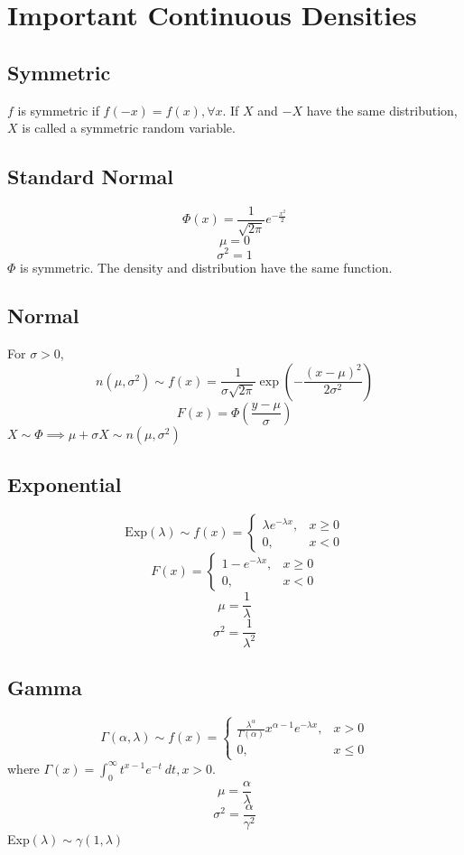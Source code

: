 \documentclass[10pt, a4paper]{extarticle}
\theoremstyle{definition}
\begin{document}
	\section{Important Continuous Densities}
	\subsection{Symmetric}
	$f$ is symmetric if $f(-x)=f(x),\forall x$. If $X$ and $-X$ have the same distribution, $X$ is called a symmetric random variable.

	\subsection{Standard Normal}
	\[\Phi(x)=\frac{1}{\sqrt{2\pi}}e^{-\frac{x^2}{2}}\]
	\[\mu=0\]
	\[\sigma^2=1\]
	$\Phi$ is symmetric. The density and distribution have the same function.

	\subsection{Normal}
	For $\sigma>0$,
	\[n(\mu,\sigma^2)\sim f(x)=\frac{1}{\sigma\sqrt{2\pi}}\exp\left(-\frac{(x-\mu)^2}{2\sigma^2}\right)\]
		\[F(x)=\Phi\left(\frac{y-\mu}{\sigma}\right)\]
	$X\sim \Phi\implies \mu+\sigma X\sim n(\mu,\sigma^2)$

	\subsection{Exponential}
	\[\text{Exp}(\lambda)\sim f(x)=
		\begin{cases}
			\lambda e^{-\lambda x},&x\geq 0\\
			0,&x<0
		\end{cases}
	\]
	\[F(x)=
		\begin{cases}
			1- e^{-\lambda x},&x\geq 0\\
			0,&x<0
		\end{cases}
	\]
	\[\mu=\frac{1}{\lambda}\]
	\[\sigma^2=\frac{1}{\lambda^2}\]

	\subsection{Gamma}
	\[\Gamma(\alpha,\lambda)\sim f(x)=
		\begin{cases}
			\frac{\lambda^\alpha}{\Gamma(\alpha)}x^{\alpha-1} e^{-\lambda x},&x> 0\\
			0,&x\leq 0
		\end{cases}
	\]
	where $\Gamma(x)=\int_0^\infty t^{x-1}e^{-t}\ dt, x>0$.
	\[\mu=\frac{\alpha}{\lambda}\]
	\[\sigma^2=\frac{\alpha}{\gamma^2}\]
	Exp$(\lambda)\sim \gamma(1,\lambda)$
\end{document}
